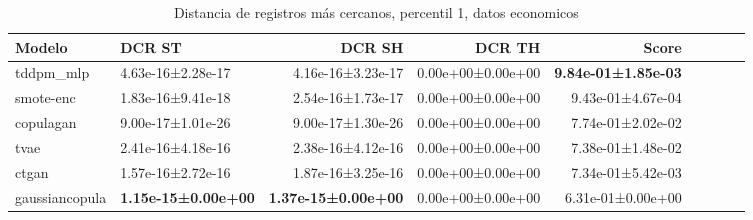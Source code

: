 \begin{table}[H]
\centering
\fontsize{10}{14}\selectfont
\caption{Distancia de registros más cercanos, percentil 1, datos economicos}
\label{table-dcr-economicos-b}
\begin{tabular}{|l|l|r|r|r|r|r|r|r|}
\hline
\rowcolor[gray]{0.8}
Modelo & DCR ST & DCR SH & DCR TH & \textbf{Score} \\
\hline tddpm\_mlp & 4.63e-16±2.28e-17 & 4.16e-16±3.23e-17 & 0.00e+00±0.00e+00 & \bfseries 9.84e-01±1.85e-03 \\
\hline smote-enc & 1.83e-16±9.41e-18 & 2.54e-16±1.73e-17 & 0.00e+00±0.00e+00 & 9.43e-01±4.67e-04 \\
\hline copulagan & \cellcolor[rgb]{0.9, 0.54, 0.52} 9.00e-17±1.01e-26 & \cellcolor[rgb]{0.9, 0.54, 0.52} 9.00e-17±1.30e-26 & 0.00e+00±0.00e+00 & 7.74e-01±2.02e-02 \\
\hline tvae & 2.41e-16±4.18e-16 & 2.38e-16±4.12e-16 & 0.00e+00±0.00e+00 & 7.38e-01±1.48e-02 \\
\hline ctgan & 1.57e-16±2.72e-16 & 1.87e-16±3.25e-16 & 0.00e+00±0.00e+00 & 7.34e-01±5.42e-03 \\
\hline gaussiancopula & \bfseries 1.15e-15±0.00e+00 & \bfseries 1.37e-15±0.00e+00 & 0.00e+00±0.00e+00 & \cellcolor[rgb]{0.9, 0.54, 0.52} 6.31e-01±0.00e+00 \\
\hline
\end{tabular}
\end{table}
